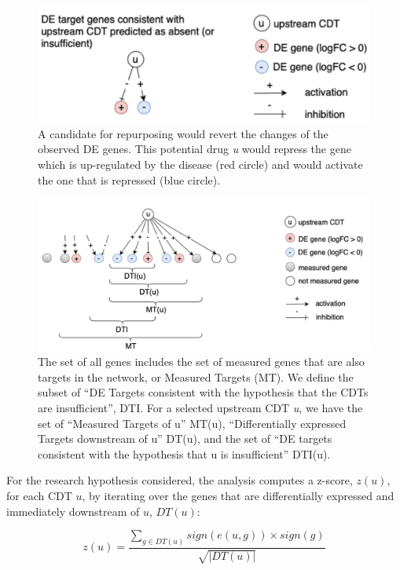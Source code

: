 \documentclass[Minh_PhD_thesis.tex]{subfiles}
\begin{document}
\begin{figure}
\centering
	\includegraphics[width=0.6\linewidth]{../Figures/TwoHypotheses.png}
        \caption{A candidate for repurposing would revert the changes of the  observed DE genes. This potential drug \emph{u} would repress the  gene which is up-regulated by the disease (red circle) and would activate the one that is repressed (blue circle). }
        \label{TwoHypotheses}
\end{figure}

\begin{figure}
	\includegraphics[width=0.9\linewidth]{../Figures/MeasuredGenes.png}
        \caption{The set of all genes includes the set of measured genes that are also targets in the network, or Measured Targets (MT). We define the subset of ``DE Targets consistent with the hypothesis that the CDTs are  insufficient'', DTI. For a selected upstream CDT \emph{u}, we have the set of ``Measured Targets of u'' MT(u), ``Differentially expressed Targets downstream of u'' DT(u), and the set of ``DE targets consistent with the hypothesis that u is insufficient'' DTI(u).}
        \label{MeasuredGenes}
\end{figure}


For the research hypothesis considered, the analysis computes a z-score, $z(u)$, for each CDT $u$, by iterating over the genes that are differentially expressed and immediately downstream of $u$, $DT(u)$: 


\begin{equation}
\label{eq:zscore}
z(u)=\frac{\sum\limits_{g \in DT(u)} sign(e(u,g)) \times sign(g)}{\sqrt{|DT(u)|}}
\end{equation}
\end{document}
